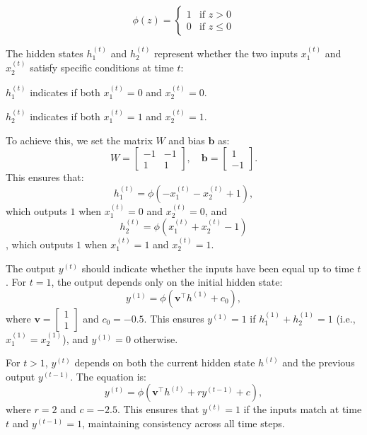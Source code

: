 \[
\phi(z) = 
\begin{cases} 
    1 & \text{if } z > 0 \\
    0 & \text{if } z \leq 0
\end{cases}
\]
\begin{qsolve}
	\begin{qsolve}[]
		The hidden states \( h_1^{(t)} \) and \( h_2^{(t)} \) represent whether the two inputs \( x_1^{(t)} \) and \( x_2^{(t)} \) satisfy specific conditions at time \( t \):
		\begin{center}
		\( h_1^{(t)} \) indicates if both \( x_1^{(t)} = 0 \) and \( x_2^{(t)} = 0 \).

		\( h_2^{(t)} \) indicates if both \( x_1^{(t)} = 1 \) and \( x_2^{(t)} = 1 \).	
		\end{center}
		
To achieve this, we set the matrix \( W \) and bias \( \mathbf{b} \) as:
\splitqsolve[\splitqsolve]
\[
W = 
\begin{bmatrix}
-1 & -1 \\
1 & 1
\end{bmatrix}, \quad
\mathbf{b} = 
\begin{bmatrix}
1 \\
-1
\end{bmatrix}.
\]
This ensures that:
\[
h_1^{(t)} = \phi(-x_1^{(t)} - x_2^{(t)} + 1),
\]
which outputs \( 1 \) when \( x_1^{(t)} = 0 \) and \( x_2^{(t)} = 0 \), and \[ h_2^{(t)} = \phi(x_1^{(t)} + x_2^{(t)} - 1) \], which outputs \( 1 \) when \( x_1^{(t)} = 1 \) and \( x_2^{(t)} = 1 \).

The output \( y^{(t)} \) should indicate whether the inputs have been equal up to time \( t \). For \( t = 1 \), the output depends only on the initial hidden state:
\[
y^{(1)} = \phi(\mathbf{v}^\top h^{(1)} + c_0),
\]
where \( \mathbf{v} = \begin{bmatrix} 1 \\ 1 \end{bmatrix} \) and \( c_0 = -0.5 \). This ensures \( y^{(1)} = 1 \) if \( h_1^{(1)} + h_2^{(1)} = 1 \) (i.e., \( x_1^{(1)} = x_2^{(1)} \)), and \( y^{(1)} = 0 \) otherwise.

For \( t > 1 \), \( y^{(t)} \) depends on both the current hidden state \( h^{(t)} \) and the previous output \( y^{(t-1)} \). The equation is:
\[
y^{(t)} = \phi(\mathbf{v}^\top h^{(t)} + r y^{(t-1)} + c),
\]
where \( r = 2 \) and \( c = -2.5 \). This ensures that \( y^{(t)} = 1 \) if the inputs match at time \( t \) and \( y^{(t-1)} = 1 \), maintaining consistency across all time steps.


\end{qsolve}
\end{qsolve}
